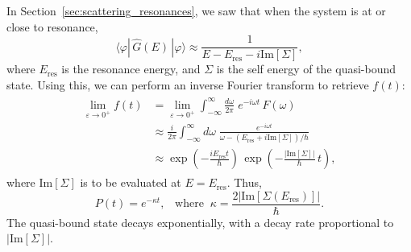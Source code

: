 \documentclass[prx,12pt]{revtex4-2}
\begin{document}
In Section~\ref{sec:scattering_resonances}, we saw that when the
system is at or close to resonance,
\begin{equation}
  \langle\varphi|\,\hat{G}(E)\,|\varphi\rangle \approx \frac{1}{\displaystyle E - E_{\mathrm{res}} - i \mathrm{Im}[\Sigma]},
\end{equation}
where $E_{\mathrm{res}}$ is the resonance energy, and $\Sigma$ is the
self energy of the quasi-bound state.  Using this, we can perform an
inverse Fourier transform to retrieve $f(t)$:
\begin{align}
  \begin{aligned} \lim_{\varepsilon\rightarrow 0^+} f(t) &= \lim_{\varepsilon\rightarrow 0^+} \int_{-\infty}^{\infty} \frac{d\omega}{2\pi} \; e^{-i\omega t} \, F(\omega) \\
    &\approx \frac{i}{2\pi} \int_{-\infty}^{\infty} d\omega\; \frac{e^{-i\omega t}}{\omega - (E_{\mathrm{res}}+i \mathrm{Im}[\Sigma])/\hbar} \\
    &\approx \exp\left(-\frac{iE_{\mathrm{res}}t}{\hbar}\right)\, \exp\left(-\frac{|\mathrm{Im}[\Sigma]|}{\hbar}\,t\right),
  \end{aligned}
\end{align}
where $\mathrm{Im}[\Sigma]$ is to be evaluated at $E =
E_{\mathrm{res}}$.  Thus,
\begin{equation}
  P(t) = e^{-\kappa t}, \;\;\;\mathrm{where}\;\;\kappa
  = \frac{2\big|\mathrm{Im}[\Sigma(E_{\mathrm{res}})]\big|}{\hbar}.
  \label{Ptresult}
\end{equation}
The quasi-bound state decays exponentially, with a decay rate
proportional to $|\mathrm{Im}[\Sigma]|$.
\end{document}
